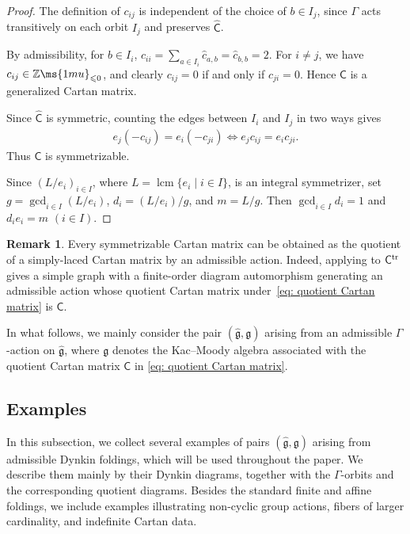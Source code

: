 \documentclass[12pt, leqno]{amsart}
\numberwithin{equation}{section}
\theoremstyle{plain}
\theoremstyle{definition}
\newtheorem{remark}[lemma]{Remark}
\renewcommand{\le}{\leqslant}
\newcommand{\g}{\mathfrak{g}}
\newcommand{\Z}{\mathbb{Z}\ms{1mu}}
\newcommand{\hc}{\widehat{c}}
\newcommand{\hg}{{\widehat{\g}}}
\newcommand{\sfC}{\mathsf{C}}
\newcommand{\hsfC}{\widehat{\sfC}}
\begin{document}
\begin{proof}
The definition of $c_{ij}$ is independent of the choice of
$b\in I_j$, since $\Gamma$ acts transitively on each orbit $I_j$ and preserves $\hsfC$.

By admissibility, for $b\in I_i$,
$c_{ii} = \sum_{a\in I_i}\hc_{a,b}  = \hc_{b,b} =
2$. For $i\ne j$, we have $c_{ij}\in\Z_{\le0}$, and clearly
$c_{ij}=0$ if and only if $c_{ji}=0$.  Hence $\sfC$ is a generalized Cartan matrix.

Since $\hsfC$ is symmetric, counting the edges between $I_i$ and $I_j$ in two ways gives
\begin{align}
\label{eq: orbit-size-cartan}
e_j(-c_{ij})=e_i(-c_{ji})
\iff
e_jc_{ij}=e_ic_{ji}.
\end{align}
Thus $\sfC$ is symmetrizable.

Since $(L/e_i)_{i\in I}$, where
$L=\operatorname{lcm}\{e_i\mid i\in I\}$, is an integral symmetrizer,
set $g=\gcd_{i\in I}(L/e_i)$, $d_i=(L/e_i)/g$, and $m=L/g$.
Then $\gcd_{i\in I}d_i=1$ and
$d_i e_i=m$ $(i\in I)$.
\end{proof}

\begin{remark}\label{rem: every symmetrizable datum is a quotient}
Every symmetrizable Cartan matrix can be obtained as the quotient of
a simply-laced Cartan matrix by an admissible action. Indeed, applying \cite[Proposition~3.2]{SS17} to
$\sfC^{{\rm tr}}$ gives a simple graph with a finite-order diagram
automorphism generating an admissible action whose quotient Cartan
matrix under~\eqref{eq: quotient Cartan matrix} is $\sfC$.
\end{remark}

In what follows, we mainly consider the pair $(\hg,\g)$ arising from
an admissible $\Gamma$-action on $\hg$, where $\g$ denotes the Kac--Moody
algebra associated with the quotient Cartan matrix $\sfC$ in
\eqref{eq: quotient Cartan matrix}.

\subsection{Examples} \label{subsec: Examples}

In this subsection, we collect several examples of pairs $(\hg,\g)$ arising from admissible Dynkin foldings, which will be used throughout
the paper.  We describe them mainly by their Dynkin diagrams, together with the $\Gamma$-orbits and the corresponding quotient diagrams.  Besides
the standard finite and affine foldings, we include examples illustrating non-cyclic group actions, fibers of larger cardinality, and indefinite
Cartan data.
\end{document}
